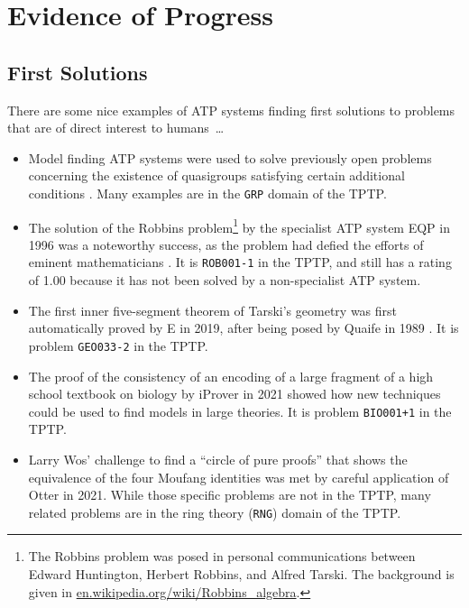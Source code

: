 \documentclass[runningheads]{llncs}
\begin{document}
\section{Evidence of Progress}
\label{Evidence}

\subsection{First Solutions}
\label{FirstSolutions}

There are some nice examples of ATP systems finding first solutions to problems that are
of direct interest to humans~\ldots

\begin{itemize}
\item Model finding ATP systems were used to solve previously open problems concerning the 
      existence of quasigroups satisfying certain additional conditions \cite{SFS95}.
      Many examples are in the {\tt GRP} domain of the TPTP.
\item The solution of the Robbins problem\footnote{%
      The Robbins problem was posed in personal communications between Edward Huntington,
      Herbert Robbins, and Alfred Tarski.
      The background is given in 
      \href{https://en.wikipedia.org/wiki/Robbins_algebra}{en.wikipedia.org/wiki/Robbins\_algebra}.}
      by the specialist ATP system EQP \cite{McC97} 
      in 1996 was a noteworthy success, as the problem had defied the efforts of eminent 
      mathematicians \cite{HMT71}.
      It is {\tt ROB001-1} in the TPTP, and still has a rating of 1.00 because 
      it has not been solved by a non-specialist ATP system.
\item The first inner five-segment theorem of Tarski's geometry \cite{SST83} was first 
      automatically proved by E \cite{Sch13-LPAR} in 2019, after being posed by Quaife in 
      1989 \cite{Qua89}.
      It is problem {\tt GEO033-2} in the TPTP.
\item The proof of the consistency of an encoding of a large fragment of a high school textbook
      on biology \cite{CDI13} by iProver \cite{Kor08} in 2021 showed how new techniques could
      be used to find models in large theories.
      It is problem {\tt BIO001+1} in the TPTP.
\item Larry Wos' challenge to find a ``circle of pure proofs'' that shows the equivalence
      of the four Moufang identities \cite{Wos19} was met by careful application \cite{Ver22} of
      Otter \cite{McC03-Otter} in 2021.
      While those specific problems are not in the TPTP, many related problems are in the
      ring theory ({\tt RNG}) domain of the TPTP.
\end{itemize}
\end{document}
